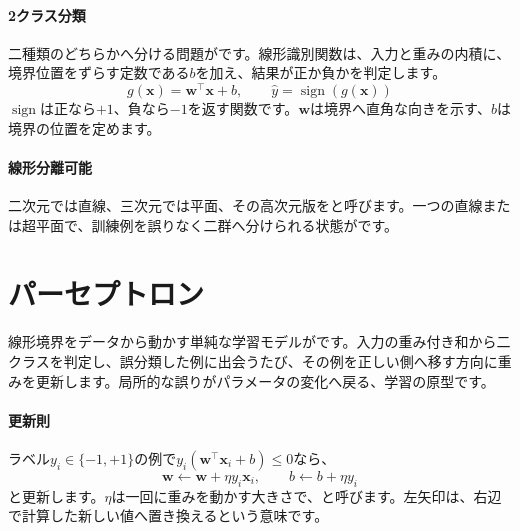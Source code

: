 \begingroup
\begingroup
      \centering
\par
\endgroup
\medskip
\begingroup
\paragraph{2クラス分類}
        二種類のどちらかへ分ける問題がです。線形識別関数は、入力と重みの内積に、境界位置をずらす定数である$b$を加え、結果が正か負かを判定します。
        \[
          g(\mathbf{x})=\mathbf{w}^\top\mathbf{x}+b,\qquad
          \hat{y}=\operatorname{sign}(g(\mathbf{x}))
        \]
        $\operatorname{sign}$は正なら$+1$、負なら$-1$を返す関数です。$\mathbf{w}$は境界へ直角な向きを示す、$b$は境界の位置を定めます。

\paragraph{線形分離可能}
        二次元では直線、三次元では平面、その高次元版をと呼びます。一つの直線または超平面で、訓練例を誤りなく二群へ分けられる状態がです。

\par
\endgroup
\par
\endgroup


\section{パーセプトロン}
\label{sec:06-machine-learning-15}

線形境界をデータから動かす単純な学習モデルがです。入力の重み付き和から二クラスを判定し、誤分類した例に出会うたび、その例を正しい側へ移す方向に重みを更新します。局所的な誤りがパラメータの変化へ戻る、学習の原型です。

\begingroup
\begingroup
\paragraph{更新則}
        ラベル$y_i\in\{-1,+1\}$の例で$y_i(\mathbf{w}^\top\mathbf{x}_i+b)\le0$なら、
        \[
          \mathbf{w}\leftarrow\mathbf{w}+\eta y_i\mathbf{x}_i,\qquad
          b\leftarrow b+\eta y_i
        \]
        と更新します。$\eta$は一回に重みを動かす大きさで、と呼びます。左矢印は、右辺で計算した新しい値へ置き換えるという意味です。


